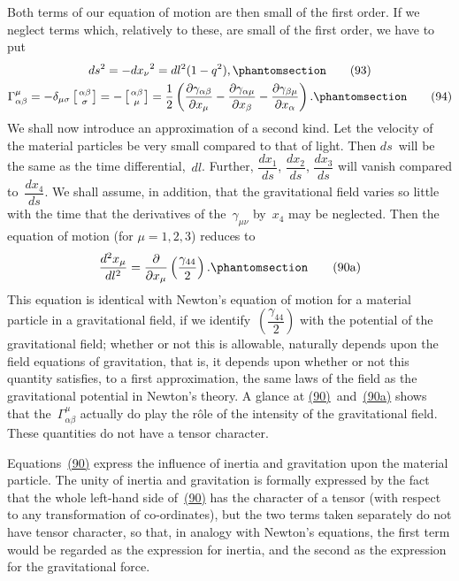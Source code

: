 \documentclass[12pt]{book}[2005/09/16]
\newcommand{\Change}[2]{#2}
\newcommand{\Add}[1]{\Change{}{#1}}
\newcommand{\PageSep}[1]{\ignorespaces}
\newcommand{\Tag}[1]{%
  \phantomsection
  \label{eqn:#1}
  \tag*{#1}
}
\newcommand{\Eqref}[1]{\hyperref[eqn:#1]{#1}}
\newcommand{\dd}{\partial}
\newcommand{\Chr}[3]{\vphantom{\big|}\smash{\genfrac{}{}{0pt}{1}{#1#2}{#3}}}
\begin{document}
Both terms of our equation of motion are then small
of the first order. If we neglect terms which, relatively
to these, are small of the first order, we have to put
\begin{gather*}
ds^{2} = \Change{}{-}{dx_{\nu}}^{2} = dl^{2} (1 - q^{2})\Add{,}
\Tag{(93)} \\
%
\Gamma_{\alpha\beta}^{\mu}
  = -\delta_{\mu\sigma} \left[\Chr{\alpha}{\beta}{\sigma}\right]
  = -\left[\Chr{\alpha}{\beta}{\mu}\right]
  = \frac{1}{2} \left(
    \frac{\dd \gamma_{\alpha\beta}}{\dd x_{\mu}}
  - \frac{\dd \gamma_{\alpha\mu}}{\dd x_{\beta}}
  - \frac{\dd \gamma_{\beta\mu}}{\dd x_{\alpha}}\right)\Add{.}
\Tag{(94)}
\end{gather*}
We shall now introduce an approximation of a second
kind. Let the velocity of the material particles be very
small compared to that of light. Then $ds$~will be the
same as the time differential,~$dl$. Further, $\dfrac{dx_{1}}{ds}$, $\dfrac{dx_{2}}{ds}$, $\dfrac{dx_{3}}{ds}$
will vanish compared to~$\dfrac{dx_{4}}{ds}$. We shall assume, in addition,
that the gravitational field varies so little with the
time that the derivatives of the~$\gamma_{\mu\nu}$ by~$x_{4}$ may be
neglected. Then the equation of motion (for $\mu = 1, 2, 3$)
reduces to
\[
\frac{d^{2} x_{\mu}}{dl^{2}}
  = \frac{\dd}{\dd x_{\mu}} \left(\frac{\gamma_{44}}{2}\right)\Add{.}
\Tag{(90a)}
\]
This equation is identical with Newton's equation of
motion for a material particle in a gravitational field, if
we identify~$\left(\dfrac{\gamma_{44}}{2}\right)$ with the potential of the gravitational
field; whether or not this is allowable, naturally depends
upon the field equations of gravitation, that is, it depends
upon whether or not this quantity satisfies, to a
first approximation, the same laws of the field as the
\PageSep{90}
gravitational potential in Newton's theory. A glance
at \Eqref{(90)}~and~\Eqref{(90a)} shows that the~$\Gamma_{\alpha\beta}^{\mu}$ actually do play
the rôle of the intensity of the gravitational field.
These quantities do not have a tensor character.

Equations~\Eqref{(90)} express the influence of inertia and
gravitation upon the material particle. The unity of
inertia and gravitation is formally expressed by the fact
that the whole left-hand side of~\Eqref{(90)} has the character
of a tensor (with respect to any transformation of co-ordinates),
but the two terms taken separately do not
have tensor character, so that, in analogy with Newton's
equations, the first term would be regarded as the expression
for inertia, and the second as the expression
for the gravitational force.
\end{document}
